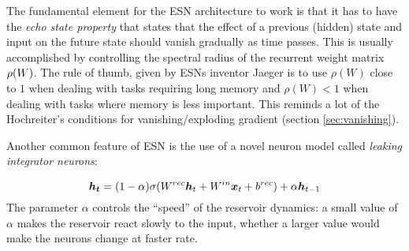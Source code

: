 The fundamental element for the ESN architecture to work is that it has to have the \textit{echo state property} that 
states that the effect of a previous (hidden) state and input on the future state should vanish gradually as time 
passes.
This is usually accomplished by controlling the spectral radius of the recurrent weight matrix $\rho(W)$.
The rule of thumb, given by ESNs inventor Jaeger is to use $\rho(W)$ close to $1$ when dealing with tasks requiring 
long memory and $\rho(W)<1$ when dealing with tasks where memory is less important.
This reminds a lot of the 
Hochreiter's conditions for vanishing/exploding gradient (section \ref{sec:vanishing}).


Another common feature of ESN is the use of a novel neuron model called \textit{leaking integrator neurons}:

\begin{equation}
 \boldsymbol{h_t} = (1-\alpha) \sigma(W^{rec}\boldsymbol{h}_t + W^{in}\boldsymbol{x}_t + b^{rec}) +\alpha \boldsymbol{h}_{t-1}
\end{equation}
 The parameter $\alpha$ controls the ``speed'' of the reservoir dynamics: a small value of $\alpha$ makes the reservoir 
react slowly to the input, whether a larger value would make the neurons change at faster rate.
